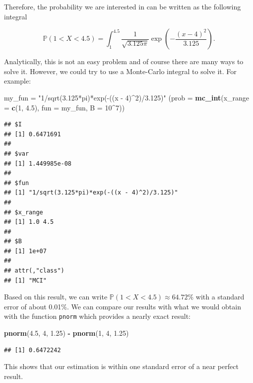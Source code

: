 \documentclass[12pt,]{krantz}
\newenvironment{Shaded}{\begin{snugshade}}{\end{snugshade}}
\newcommand{\KeywordTok}[1]{\textcolor[rgb]{0.27,0.27,0.27}{\textbf{#1}}}
\newcommand{\DataTypeTok}[1]{\textcolor[rgb]{0.27,0.27,0.27}{#1}}
\newcommand{\DecValTok}[1]{\textcolor[rgb]{0.06,0.06,0.06}{#1}}
\newcommand{\FloatTok}[1]{\textcolor[rgb]{0.06,0.06,0.06}{#1}}
\newcommand{\StringTok}[1]{\textcolor[rgb]{0.5,0.5,0.5}{#1}}
\newcommand{\OperatorTok}[1]{\textcolor[rgb]{0.43,0.43,0.43}{\textbf{#1}}}
\newcommand{\NormalTok}[1]{#1}
\begin{document}
Therefore, the probability we are interested in can be written as the
following integral

\[
\mathbb{P}\left(1 < X < 4.5 \right) = \int_1^{4.5} \frac{1}{\sqrt{3.125 \pi}} \exp \left(- \frac{\left(x - 4\right)^2}{3.125}\right).
\]

Analytically, this is not an easy problem and of course there are many
ways to solve it. However, we could try to use a Monte-Carlo integral to
solve it. For example:

\begin{Shaded}
\begin{Highlighting}[]
\NormalTok{my_fun =}\StringTok{ "1/sqrt(3.125*pi)*exp(-((x - 4)^2)/3.125)"}
\NormalTok{(}\DataTypeTok{prob =} \KeywordTok{mc_int}\NormalTok{(}\DataTypeTok{x_range =} \KeywordTok{c}\NormalTok{(}\DecValTok{1}\NormalTok{, }\FloatTok{4.5}\NormalTok{), }\DataTypeTok{fun =}\NormalTok{ my_fun, }\DataTypeTok{B =} \DecValTok{10}\OperatorTok{^}\DecValTok{7}\NormalTok{))}
\end{Highlighting}
\end{Shaded}

\begin{verbatim}
## $I
## [1] 0.6471691
## 
## $var
## [1] 1.449985e-08
## 
## $fun
## [1] "1/sqrt(3.125*pi)*exp(-((x - 4)^2)/3.125)"
## 
## $x_range
## [1] 1.0 4.5
## 
## $B
## [1] 1e+07
## 
## attr(,"class")
## [1] "MCI"
\end{verbatim}

Based on this result, we can write
\(\mathbb{P}\left(1 < X < 4.5 \right) \approx 64.72 \%\) with a standard
error of about 0.01\%. We can compare our results with what we would
obtain with the function \texttt{pnorm} which provides a nearly exact
result:

\begin{Shaded}
\begin{Highlighting}[]
\KeywordTok{pnorm}\NormalTok{(}\FloatTok{4.5}\NormalTok{, }\DecValTok{4}\NormalTok{, }\FloatTok{1.25}\NormalTok{) }\OperatorTok{-}\StringTok{ }\KeywordTok{pnorm}\NormalTok{(}\DecValTok{1}\NormalTok{, }\DecValTok{4}\NormalTok{, }\FloatTok{1.25}\NormalTok{)}
\end{Highlighting}
\end{Shaded}

\begin{verbatim}
## [1] 0.6472242
\end{verbatim}

This shows that our estimation is within one standard error of a near
perfect result.
\end{document}
